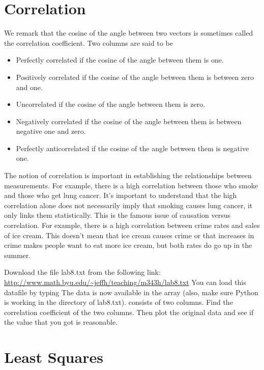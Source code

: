 \section*{Correlation}

We remark that the cosine of the angle between two vectors is sometimes called the correlation coefficient.  Two columns are said to be 
\begin{itemize}
\item Perfectly correlated if the cosine of the angle between them is one.
\item Positively correlated if the cosine of the angle between them is between zero and one.
\item Uncorrelated if the cosine of the angle between them is zero.
\item Negatively correlated if the cosine of the angle between them is between negative one and zero.
\item Perfectly anticorrelated if the cosine of the angle between them is negative one.
\end{itemize}

The notion of correlation is important in establishing the relationships between measurements.  For example, there is a high correlation between those who smoke and those who get lung cancer.  It's important to understand that the high correlation alone does not necessarily imply that smoking causes lung cancer, it only links them statistically.  This is the famous issue of causation versus correlation.  For example, there is a high correlation between crime rates and sales of ice cream.  This doesn't mean that ice cream causes crime or that increases in crime makes people want to eat more ice cream, but both rates do go up in the summer.

\begin{problem}
Download the file lab8.txt from the following link:
\url{http://www.math.byu.edu/~jeffh/teaching/m343h/lab8.txt}
You can load this datafile by typing
The data is now available in the array  (also, make sure Python is working in the directory of lab8.txt).   consists of two columns.  Find the correlation coefficient of the two columns.  Then plot the original data and see if the value that you got is reasonable.
\end{problem}

\section*{Least Squares}

